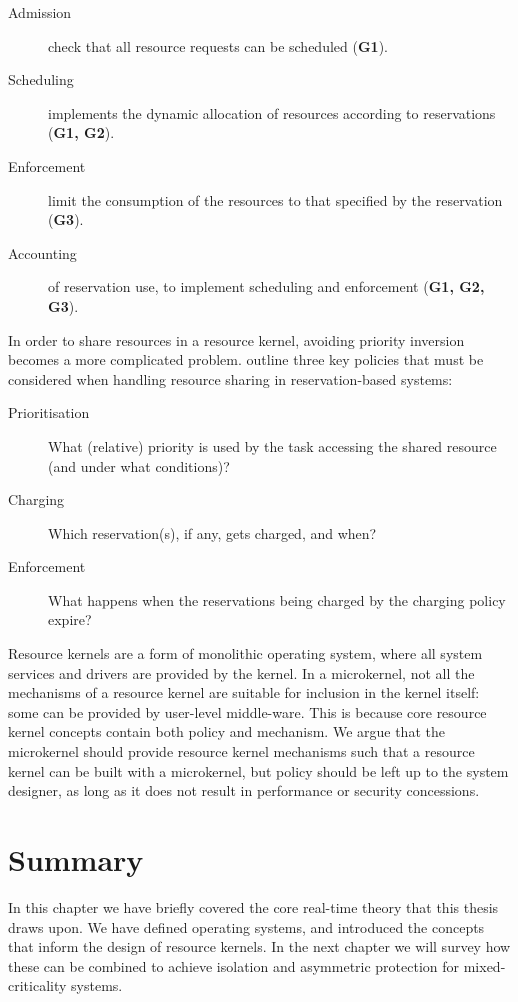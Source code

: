 \begin{description}
	\item[Admission] check that all resource requests can be scheduled (\textbf{G1}).
	\item[Scheduling] implements the dynamic allocation of resources according to reservations (\textbf{G1, G2}).
	\item[Enforcement] limit the consumption of the resources to that specified by the
        reservation (\textbf{G3}).
	\item[Accounting] of reservation use, to implement scheduling and enforcement (\textbf{G1, G2, G3}).
\end{description}

\label{p:resource-kernel-resource-sharing}
In order to share resources in a resource kernel, avoiding priority inversion becomes a more
complicated problem.  \citet{deNiz_LSR_01} outline three key policies that must be considered when
handling resource sharing in reservation-based systems:

\begin{description}
    \item[Prioritisation] What (relative) priority is used by the task accessing the shared resource (and under what conditions)?
    \item[Charging] Which reservation(s), if any, gets charged, and when?
    \item[Enforcement] What happens when the reservations being charged by the charging policy expire?
\end{description}

Resource kernels are a form of monolithic operating system, where all system services and drivers
are provided by the kernel.  In a microkernel, not all the mechanisms of a resource kernel are
suitable for inclusion in the kernel itself: some can be provided by user-level middle-ware.  This
is because core resource kernel concepts contain both policy and mechanism.  We argue that the
microkernel should provide resource kernel mechanisms such that a resource kernel can be built with
a microkernel, but policy should be left up to the system designer, as long as it does not result in
performance or security concessions.

\section{Summary}

In this chapter we have briefly covered the core real-time theory that this thesis draws upon.
We have defined operating systems, and introduced the concepts that inform the design of resource kernels.
In the next chapter we will survey how these can be combined to achieve isolation and asymmetric protection for mixed-criticality systems.
